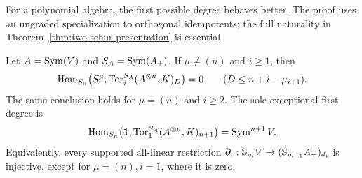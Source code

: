 For a polynomial algebra, the first possible degree behaves better.
The proof uses an ungraded specialization to orthogonal idempotents;
the full naturality in Theorem~\ref{thm:two-schur-presentation} is essential.

\begin{theorem}
\label{thm:polynomial-schur-fronts}
Let $A=\operatorname{Sym}(V)$ and $S_A=\operatorname{Sym}(A_+)$. If $\mu\ne(n)$ and $i\ge1$,
then
\[
 \operatorname{Hom}_{S_n}\bigl(S^\mu,\operatorname{Tor}_i^{S_A}(A^{\otimes n},K)_D\bigr)=0
                         \qquad(D\le n+i-\mu_{i+1}).
\]
The same conclusion holds for $\mu=(n)$ and $i\ge2$.
The sole exceptional first degree is
\[
 \operatorname{Hom}_{S_n}\bigl(\mathbf1,
       \operatorname{Tor}_1^{S_A}(A^{\otimes n},K)_{n+1}\bigr)=\operatorname{Sym}^{n+1}V.
\]
Equivalently, every supported all-linear restriction
$\partial_i:\mathbb S_{\rho_i}V\to
(\mathbb S_{\rho_{i-1}}A_+)_{d_i}$ is injective, except for
$\mu=(n),i=1$, where it is zero.
\end{theorem}

